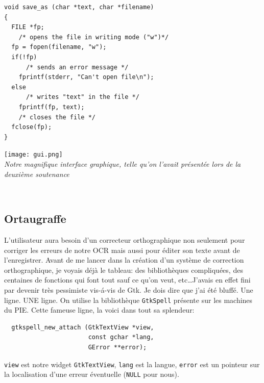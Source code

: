 \documentclass[a4paper,12pt]{report}
\begin{document}
\begin{lstlisting}
void save_as (char *text, char *filename)
{
  FILE *fp;
    /* opens the file in writing mode ("w")*/
  fp = fopen(filename, "w");
  if(!fp)
      /* sends an error message */
    fprintf(stderr, "Can't open file\n");
  else
      /* writes "text" in the file */
    fprintf(fp, text);
    /* closes the file */
  fclose(fp);
}
\end{lstlisting}

\begin{center}

	\texttt{[image: gui.png]}\\
	\caption{\emph{Notre magnifique interface graphique, telle qu'on l'avait pr\'esent\'ee lors de la deuxi\`eme soutenance}}\\
\end{center}


\subsection{Ortaugraffe} %
\label{sec:ortaugraffe}
	L'utilisateur aura besoin d'un correcteur orthographique non seulement pour corriger les erreurs de notre OCR mais aussi pour \'editer son texte avant de l'enregistrer. Avant de me lancer dans la cr\'eation d'un syst\`eme de correction orthographique, je voyais d\'ej\`a le tableau: des biblioth\`eques compliqu\'ees, des centaines de fonctions qui font tout sauf ce qu'on veut, etc\ldots J'avais en effet fini par devenir tr\`es pessimiste vis-\'a-vis de Gtk. Je dois dire que j'ai \'et\'e bluff\'e. Une ligne. UNE ligne. On utilise la biblioth\`eque \verb!GtkSpell! pr\'esente sur les machines du PIE. Cette fameuse ligne, la voici dans tout sa splendeur:
	\begin{lstlisting}
  gtkspell_new_attach (GtkTextView *view,
                       const gchar *lang,
                       GError **error);
	\end{lstlisting}
	\verb!view! est notre widget \verb!GtkTextView!, \verb!lang! est la langue, \verb!error! est un pointeur sur la localisation d'une erreur \'eventuelle (\verb!NULL! pour nous).


\end{document}
